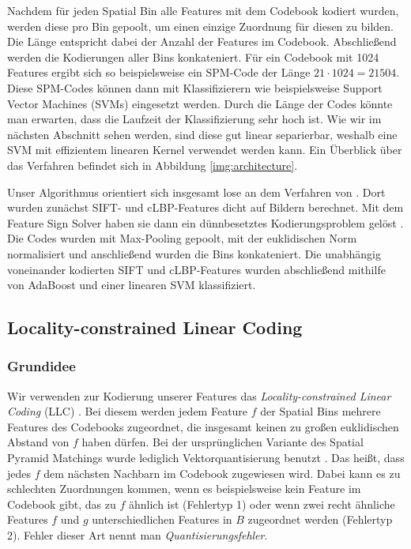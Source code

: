 Nachdem für jeden Spatial Bin alle Features mit dem Codebook kodiert wurden, werden diese pro Bin gepoolt, um einen einzige Zuordnung für diesen zu bilden. Die Länge entspricht dabei der Anzahl der Features im Codebook. Abschließend werden die Kodierungen aller Bins konkateniert. Für ein Codebook mit 1024 Features ergibt sich so beispielsweise ein SPM-Code der Länge $21 \cdot 1024 = 21504$. Diese SPM-Codes können dann mit Klassifizierern wie beispielsweise Support Vector Machines (SVMs) eingesetzt werden. Durch die Länge der Codes könnte man erwarten, dass die Laufzeit der Klassifizierung sehr hoch ist. Wie wir im nächsten Abschnitt sehen werden, sind diese gut linear separierbar, weshalb eine SVM mit effizientem linearen Kernel verwendet werden kann. Ein Überblick über das Verfahren befindet sich in Abbildung \ref{img:architecture}.

Unser Algorithmus orientiert sich insgesamt lose an dem Verfahren von \cite{ywkjwh13}. Dort wurden zunächst SIFT- und cLBP-Features dicht auf Bildern berechnet. Mit dem Feature Sign Solver haben sie dann ein dünnbesetztes Kodierungsproblem gelöst \cite{lbrn07}. Die Codes wurden mit Max-Pooling gepoolt, mit der euklidischen Norm normalisiert und anschließend wurden die Bins konkateniert. Die unabhängig voneinander kodierten SIFT und cLBP-Features wurden abschließend mithilfe von AdaBoost und einer linearen SVM klassifiziert.

\subsection{Locality-constrained Linear Coding}

\subsubsection{Grundidee}

Wir verwenden zur Kodierung unserer Features das \emph{Locality-constrained Linear Coding} (LLC) \cite{wyylhg10}. Bei diesem werden jedem Feature $f$ der Spatial Bins mehrere Features des Codebooks zugeordnet, die insgesamt keinen zu großen euklidischen Abstand von $f$ haben dürfen. Bei der ursprünglichen Variante des Spatial Pyramid Matchings wurde lediglich Vektorquantisierung benutzt \cite{lsp06}. Das heißt, dass jedes $f$ dem nächsten Nachbarn im Codebook zugewiesen wird. Dabei kann es zu schlechten Zuordnungen kommen, wenn es beispielsweise kein Feature im Codebook gibt, das zu $f$ ähnlich ist (Fehlertyp 1) oder wenn zwei recht ähnliche Features $f$ und $g$ unterschiedlichen Features in $B$ zugeordnet werden (Fehlertyp 2). Fehler dieser Art nennt man \emph{Quantisierungsfehler}.


